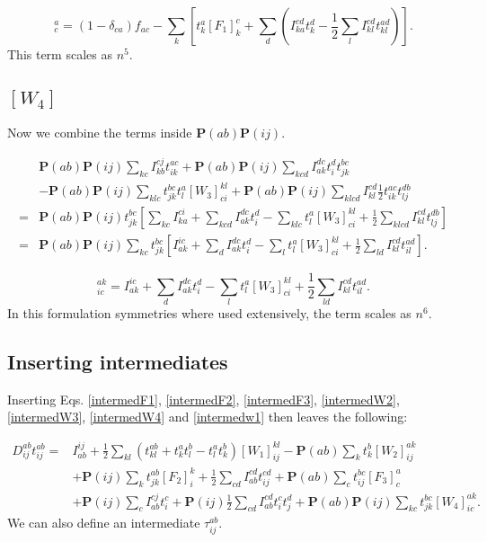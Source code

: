 \begin{equation}
[F_3]_c^a = (1-\delta_{ca}) f_{ac}
- \sum_{k} \left[ t_k^a [F_1]_k^c
+ \sum_{d} \left( I_{ka}^{cd} t_k^d 
- \frac{1}{2} \sum_{l} I_{kl}^{cd} t_{kl}^{ad} \right) \right] . \label{intermedF3}
\end{equation}
This term scales as $n^5$.

\subsection{$[W_4]$}
Now we combine the terms inside $\textbf{P}(ab) \textbf{P}(ij)$. 

\begin{align}
& \textbf{P}(ab) \textbf{P}(ij) \sum_{kc} I_{kb}^{cj} t_{ik}^{ac}
+ \textbf{P}(ab) \textbf{P}(ij) \sum_{kcd} I_{ak}^{dc} t_i^d t_{jk}^{bc}
\nonumber \\ &
- \textbf{P}(ab) \textbf{P}(ij) \sum_{klc} t_{jk}^{bc} t_l^a [W_3]_{ci}^{kl}
+ \textbf{P}(ab) \textbf{P}(ij) \sum_{klcd} I_{kl}^{cd} \frac{1}{2} t_{ik}^{ac} t_{lj}^{db}
\nonumber \\
= & \textbf{P}(ab) \textbf{P}(ij) t^{bc}_{jk} \left[
\sum_{kc} I_{ka}^{ci} 
+ \sum_{kcd} I_{ak}^{dc} t_i^d
- \sum_{klc} t_l^a [W_3]_{ci}^{kl}
+ \frac{1}{2} \sum_{klcd} I_{kl}^{cd} t_{lj}^{db}
\right] \nonumber \\ 
= &
\textbf{P}(ab) \textbf{P}(ij)  \sum_{kc} t^{bc}_{jk} \left[
I_{ak}^{ic} 
+ \sum_{d} I_{ak}^{dc} t_i^d
- \sum_{l} t_l^a [W_3]_{ci}^{kl}
+ \frac{1}{2} \sum_{ld} I_{kl}^{cd} t_{il}^{ad}
\right] .
\end{align}

\begin{equation}
[W_4]_{ic}^{ak} = 
I_{ak}^{ic} 
+ \sum_{d} I_{ak}^{dc} t_i^d
- \sum_{l} t_l^a [W_3]_{ci}^{kl}
+ \frac{1}{2} \sum_{ld} I_{kl}^{cd} t_{il}^{ad} .
\label{intermedW4}
\end{equation}
In this formulation symmetries where used extensively, the term scales as $n^6$.

\subsection{Inserting intermediates}
Inserting Eqs. \eqref{intermedF1}, \eqref{intermedF2}, \eqref{intermedF3}, \eqref{intermedW2}, \eqref{intermedW3}, \eqref{intermedW4} and \eqref{intermedw1} then leaves the following:

\begin{align}
D_{ij}^{ab} t_{ij}^{ab} = & 
I_{ab}^{ij} +
\frac{1}{2} \sum_{kl} (t_{kl}^{ab} + t_k^a t_l^b - t_l^a t_k^b) [W_1]_{ij}^{kl}
- \textbf{P}(ab) \sum_k t_k^b [W_2]_{ij}^{ak}
\nonumber \\ &
+ \textbf{P}(ij) \sum_k t_{jk}^{ab} [F_2]_i^k
+ \frac{1}{2} \sum_{cd} I_{ab}^{cd} t_{ij}^{cd}
+ \textbf{P}(ab) \sum_c t_{ij}^{bc} [F_3]_c^a
\nonumber \\ &
+ \textbf{P}(ij) \sum_c I_{ab}^{cj} t_i^c
+ \textbf{P}(ij) \frac{1}{2} \sum_{cd} I_{ab}^{cd} t_i^c t_j^d 
+ \textbf{P}(ab) \textbf{P}(ij) \sum_{kc} t_{jk}^{bc} [W_4]_{ic}^{ak} .
\end{align}
We can also define an intermediate $\tau_{ij}^{ab}$.

